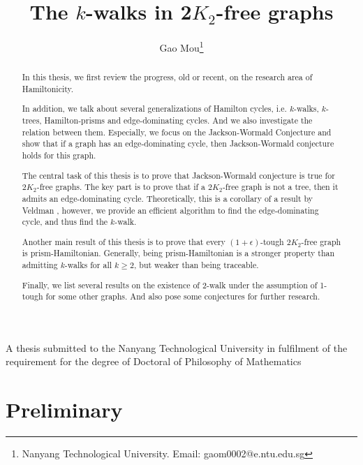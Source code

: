 \documentclass[12pt]{report}
\author{Gao Mou\thanks{Nanyang Technological University. Email: gaom0002@e.ntu.edu.sg}}
\title{The $k$-walks in 2$K_2$-free graphs}
\begin{document}
\begin{titlepage}




\maketitle



A thesis submitted to the Nanyang Technological University in fulfilment of the requirement for the degree of Doctoral of Philosophy of Mathematics
\end{titlepage}

\listoffigures

\tableofcontents

\begin{abstract}
In this thesis, we first review the progress, old or recent, on the research area of Hamiltonicity.

In addition, we talk about several generalizations of Hamilton cycles, i.e. $k$-walks, $k$-trees, Hamilton-prisms and edge-dominating cycles. And we also investigate the relation between them. Especially, we focus on the Jackson-Wormald Conjecture and show that if a graph has an edge-dominating cycle, then Jackson-Wormald conjecture holds for this graph.

The central task of this thesis is to prove that Jackson-Wormald conjecture is true for $2K_2$-free graphs. The key part is to prove that if a $2K_2$-free graph is not a tree, then it admits an edge-dominating cycle. Theoretically, this is a corollary of a result by Veldman \cite{veldman1983existence}, however, we provide an efficient algorithm to find the edge-dominating cycle, and thus find the $k$-walk. 

Another main result of this thesis is to prove that every $(1+\epsilon)$-tough $2K_2$-free graph is prism-Hamiltonian. Generally, being prism-Hamiltonian is a stronger property than admitting $k$-walks for all $k\ge2$, but weaker than being traceable.

Finally, we list several results on the existence of 2-walk under the assumption of 1-tough for some other graphs. And also pose some conjectures for further research.
\end{abstract}

\chapter{Preliminary}\label{cpre}
\end{document}
